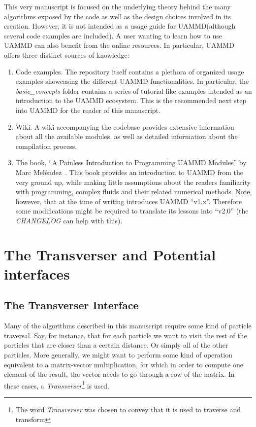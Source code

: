 \documentclass[twoside,openright,titlepage,numbers=noenddot,%
headinclude,footinclude,cleardoublepage=empty,abstract=on,
BCOR=5mm,fontsize=11pt, dvipsnames, paper=b5
]{scrreprt}
\newcommand{\uammd}{\gls{UAMMD}\xspace}
\begin{document}
This very manuscript is focused on the underlying theory behind the many algorithms exposed by the code as well as the design choices involved in its creation. However, it is not intended as a usage guide for \uammd (although several code examples are included). A user wanting to learn how to use \uammd can also benefit from the online resources. In particular, \uammd offers three distinct sources of knowledge:
\begin{enumerate}
\item Code examples.
  The repository itself contains a plethora of organized usage examples showcasing the different \uammd functionalities. In particular, the \emph{basic\_concepts} folder contains a series of tutorial-like examples intended as an introduction to the \uammd ecosystem. This is the recommended next step into UAMMD for the reader of this manuscript.
\item Wiki.
  A wiki accompanying the codebase provides extensive information about all the available modules, as well as detailed information about the compilation process.
\item The book, ``A Painless Introduction to Programming UAMMD Modules'' by Marc Meléndez~\cite{Marc2020}.
  This book provides an introduction to \uammd from the very ground up, while making little assumptions about the readers familiarity with programming, complex fluids and their related numerical methods. Note, however, that at the time of writing \cite{Marc2020} introduces UAMMD ``v1.x''. Therefore some modifications might be required to translate its lessons into ``v2.0'' (the \emph{CHANGELOG} can help with this).
\end{enumerate}

\chapter{The Transverser and Potential interfaces}\label{ch:transverser}

\section{The Transverser Interface} \label{sec:transverser}

Many of the algorithms described in this manuscript require some kind of particle traversal.
Say, for instance, that for each particle we want to visit the rest of the particles that are closer than a certain distance. Or simply all of the other particles. More generally, we might want to perform some kind of operation equivalent to a matrix-vector multiplication, for which in order to compute one element of the result, the vector needs to go through a row of the matrix.
In these cases, a \emph{Transverser}\footnote{The word \emph{Transverser} was chosen to convey that it is used to traverse and transform} is used.
\end{document}
